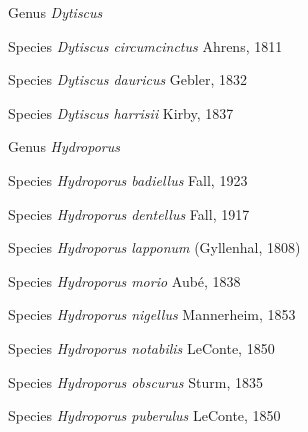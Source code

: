 \documentclass[9pt, article]{memoir}
\begin{document}
\begin{multicols}{2}
\vspace{6pt}\noindent\hspace{30pt}Genus \textit{Dytiscus}


\vspace{6pt}\noindent\hspace{36pt}Species \textit{Dytiscus circumcinctus} Ahrens, 1811


\vspace{6pt}\noindent\hspace{36pt}Species \textit{Dytiscus dauricus} Gebler, 1832


\vspace{6pt}\noindent\hspace{36pt}Species \textit{Dytiscus harrisii} Kirby, 1837


\vspace{6pt}\noindent\hspace{30pt}Genus \textit{Hydroporus}


\vspace{6pt}\noindent\hspace{36pt}Species \textit{Hydroporus badiellus} Fall, 1923


\vspace{6pt}\noindent\hspace{36pt}Species \textit{Hydroporus dentellus} Fall, 1917


\vspace{6pt}\noindent\hspace{36pt}Species \textit{Hydroporus lapponum} (Gyllenhal, 1808)


\vspace{6pt}\noindent\hspace{36pt}Species \textit{Hydroporus morio} Aubé, 1838


\vspace{6pt}\noindent\hspace{36pt}Species \textit{Hydroporus nigellus} Mannerheim, 1853


\vspace{6pt}\noindent\hspace{36pt}Species \textit{Hydroporus notabilis} LeConte, 1850


\vspace{6pt}\noindent\hspace{36pt}Species \textit{Hydroporus obscurus} Sturm, 1835


\vspace{6pt}\noindent\hspace{36pt}Species \textit{Hydroporus puberulus} LeConte, 1850



\end{multicols}
\end{document}
